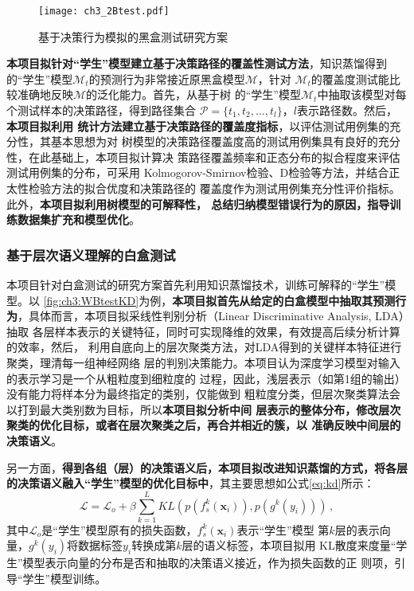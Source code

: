 \begin{figure}[htp]
    \begin{small}
        \begin{center}
            \texttt{[image: ch3\_2Btest.pdf]}
        \end{center}
        \caption{基于决策行为模拟的黑盒测试研究方案}
        \label{fig:ch3:2Btest}
    \end{small}
\end{figure}

\textbf{本项目拟针对``学生''模型建立基于决策路径的覆盖性测试方法}，知识蒸馏得到
的``学生''模型$\mathcal M_t$的预测行为非常接近原黑盒模型$\mathcal M$，针对
$\mathcal M_t$的覆盖度测试能比较准确地反映$\mathcal M$的泛化能力。首先，从基于树
的``学生''模型$\mathcal M_t$中抽取该模型对每个测试样本的决策路径，得到路径集合
$\mathcal P=\{t_1, t_2,\dots, t_l\}$，$l$表示路径数。然后，\textbf{本项目拟利用
统计方法建立基于决策路径的覆盖度指标}，以评估测试用例集的充分性，其基本思想为对
树模型的决策路径覆盖度高的测试用例集具有良好的充分性，在此基础上，本项目拟计算决
策路径覆盖频率和正态分布的拟合程度来评估测试用例集的分布，可采用
Kolmogorov-Smirnov检验、D检验等方法，并结合正太性检验方法的拟合优度和决策路径的
覆盖度作为测试用例集充分性评价指标。此外，\textbf{本项目拟利用树模型的可解释性，
总结归纳模型错误行为的原因，指导训练数据集扩充和模型优化}。

\subsubsection{基于层次语义理解的白盒测试}\label{ch3_2}

本项目针对白盒测试的研究方案首先利用知识蒸馏技术，训练可解释的``学生''模型。以
\cref{fig:ch3:WBtestKD}为例，\textbf{本项目拟首先从给定的白盒模型中抽取其预测行
为}，具体而言，本项目拟采线性判别分析（Linear Discriminative Analysis, LDA）抽取
各层样本表示的关键特征，同时可实现降维的效果，有效提高后续分析计算的效率，然后，
利用自底向上的层次聚类方法，对LDA得到的关键样本特征进行聚类，理清每一组神经网络
层的判别决策能力。本项目认为深度学习模型对输入的表示学习是一个从粗粒度到细粒度的
过程，因此，浅层表示（如第1组的输出）没有能力将样本分为最终指定的类别，仅能做到
粗粒度分类，但层次聚类算法会以打到最大类别数为目标，所以\textbf{本项目拟分析中间
层表示的整体分布，修改层次聚类的优化目标，或者在层次聚类之后，再合并相近的簇，以
准确反映中间层的决策语义}。

另一方面，\textbf{得到各组（层）的决策语义后，本项目拟改进知识蒸馏的方式，将各层
的决策语义融入``学生''模型的优化目标中}，其主要思想如公式\eqref{eq:kd}所示：
\begin{equation}
    \mathcal{L} = \mathcal{L}_o + \beta\sum_{k=1}^L KL(p(f_s^k(\bm x_i)), p(g^k(y_i))) \,,
    \label{eq:kd}
\end{equation}
其中$\mathcal L_o$是``学生''模型原有的损失函数，$f_s^k(\bm x_i)$表示``学生''模型
第$k$层的表示向量，$g^k(y_i)$将数据标签$y_i$转换成第$k$层的语义标签，本项目拟用
KL散度来度量``学生''模型表示向量的分布是否和抽取的决策语义接近，作为损失函数的正
则项，引导``学生''模型训练。


